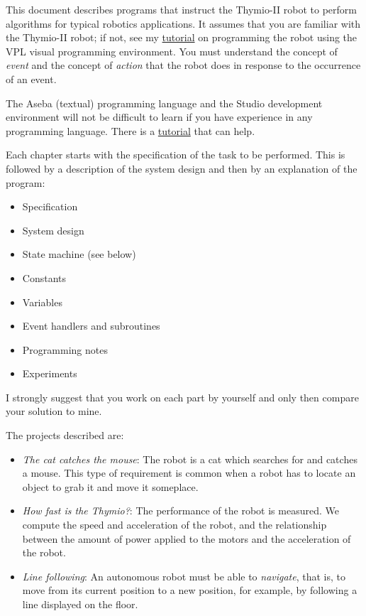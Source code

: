
This document describes programs that instruct the Thymio-II robot to
perform algorithms for typical robotics applications. It assumes that
you are familiar with the Thymio-II robot; if not, see my
\href{https://aseba.wdfiles.com/local--files/en:thymioprogram/thymio-vpl-tutorial-en.zip}{tutorial}
on programming the robot using the VPL visual programming environment.
You must understand the concept of \emph{event} and the concept of
\emph{action} that the robot does in response to the occurrence of an
event.

The Aseba (textual) programming language and the Studio development
environment will not be difficult to learn if you have experience in any
programming language. There is a
\href{https://aseba.wikidot.com/en:thymiotutoriel}{tutorial} that can
help.


Each chapter starts with the specification of the task to be performed.
This is followed by a description of the system design and then by an
explanation of the program:

\begin{itemize}
\item Specification
\item System design
\item State machine (see below)
\item Constants
\item Variables
\item Event handlers and subroutines
\item Programming notes
\item Experiments
\end{itemize}

I strongly suggest that you work on each part by yourself and only then
compare your solution to mine.

The projects described are:

\begin{itemize}

\item \emph{The cat catches the mouse}: The robot is a cat which
searches for and catches a mouse. This type of requirement is common
when a robot has to locate an object to grab it and move it someplace.

\item \emph{How fast is the Thymio?}: The performance of the robot is
measured. We compute the speed and acceleration of the robot, and
the relationship between the amount of power applied to the motors and
the acceleration of the robot.

\item \emph{Line following}: An autonomous robot must be able to
\emph{navigate}, that is, to move from its current position to a new
position, for example, by following a line displayed on the floor.

\end{itemize}

